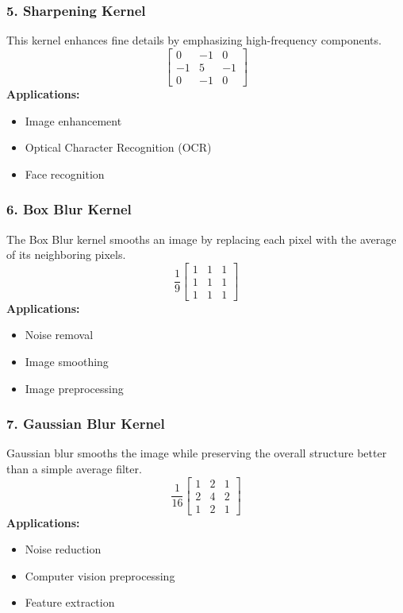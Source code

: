 \documentclass[11pt]{article}
\begin{document}
\subsubsection*{5. Sharpening Kernel}
This kernel enhances fine details by emphasizing high-frequency components. 
$$ \begin{bmatrix} 0 & -1 & 0 \\ -1 & 5 & -1 \\ 0 & -1 & 0 \end{bmatrix} $$
\textbf{Applications:}
\begin{itemize}
    \item Image enhancement 
    \item Optical Character Recognition (OCR) 
    \item Face recognition 
\end{itemize}

\subsubsection*{6. Box Blur Kernel}
The Box Blur kernel smooths an image by replacing each pixel with the average of its neighboring pixels. 
$$ \frac{1}{9} \begin{bmatrix} 1 & 1 & 1 \\ 1 & 1 & 1 \\ 1 & 1 & 1 \end{bmatrix} $$
\textbf{Applications:}
\begin{itemize}
    \item Noise removal 
    \item Image smoothing 
    \item Image preprocessing 
\end{itemize}

\subsubsection*{7. Gaussian Blur Kernel}
Gaussian blur smooths the image while preserving the overall structure better than a simple average filter. 
$$ \frac{1}{16} \begin{bmatrix} 1 & 2 & 1 \\ 2 & 4 & 2 \\ 1 & 2 & 1 \end{bmatrix} $$
\textbf{Applications:}
\begin{itemize}
    \item Noise reduction 
    \item Computer vision preprocessing 
    \item Feature extraction 
\end{itemize}
\end{document}
